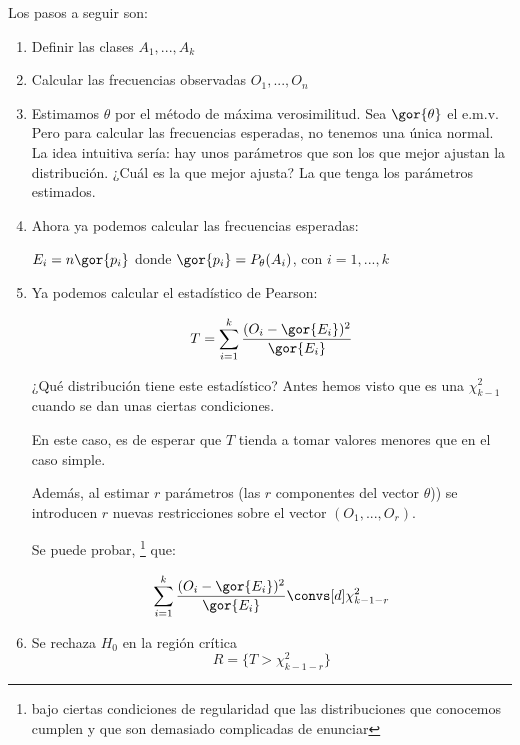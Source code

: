 Los pasos a seguir son:
\begin{enumerate}
	\item Definir las clases $A_1,...,A_k$
	\item Calcular las frecuencias observadas $O_1,...,O_n$
	\item Estimamos $\theta$ por el método de máxima verosimilitud. Sea $\gor{\theta}$ el e.m.v.
	\subitem Pero para calcular las frecuencias esperadas, no tenemos una única normal. La idea intuitiva sería: hay unos parámetros que son los que mejor ajustan la distribución. ¿Cuál es la que mejor ajusta? La que tenga los parámetros estimados.
	\item Ahora ya podemos calcular las frecuencias esperadas:

	$E_i = n\gor{p_i}$ donde $\gor{p_i} = P_{\theta}(A_i)$, con $i=1,...,k$
	\item Ya podemos calcular el estadístico de Pearson:

	\[
	T= \sum_{i=1}^k \frac{(O_i - \gor{E_i})^2}{\gor{E_i}}
	\]

	\subitem ¿Qué distribución tiene este estadístico? Antes hemos visto que es una $\chi^2_{k-1}$ cuando se dan unas ciertas condiciones.

	En este caso, es de esperar que $T$ tienda a tomar valores menores que en el caso simple.

	Además, al estimar $r$ parámetros (las $r$ componentes del vector $\theta$)) se introducen $r$ nuevas restricciones sobre el vector $(O_1,...,O_r)$.

Se puede probar, \footnote{bajo ciertas condiciones de regularidad que las distribuciones que conocemos cumplen y que son demasiado complicadas de enunciar} que:

\[
	\sum_{i=1}^k \frac{(O_i - \gor{E_i})^2}{\gor{E_i}} \convs[d] \chi^2_{k-1-r}
\]

	\item Se rechaza $H_0$ en  la región crítica \[R = \{ T > \chi^2_{k-1-r}\}\]
\end{enumerate}

